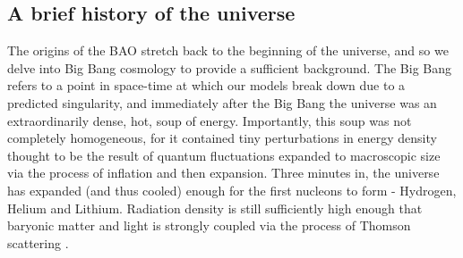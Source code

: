 \documentclass[titlesmallcaps, examinerscopy, copyrightpage]{uqthesis}
\begin{document}
\subsection{A brief history of the universe}

The origins of the BAO stretch back to the beginning of the universe, and so we delve into Big Bang cosmology to provide a sufficient background. The Big Bang refers to a point in space-time at which our models break down due to a predicted singularity, and immediately after the Big Bang the universe was an extraordinarily dense, hot, soup of energy. Importantly, this soup was not completely homogeneous, for it contained tiny perturbations in energy density thought to be the result of quantum fluctuations expanded to macroscopic size via the process of inflation and then expansion. Three minutes in, the universe has expanded (and thus cooled) enough for the first nucleons to form - Hydrogen, Helium and Lithium. Radiation density is still sufficiently high enough that baryonic matter and light is strongly coupled via the process of Thomson scattering \citep{PeeblesYu1970, Doroshkevich1978, SunyaevZeldovich1970}.
\end{document}
